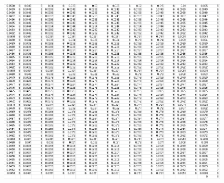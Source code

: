 \documentclass{article}
\begin{document}
\begin{center}
\begin{figure}
 \includegraphics[keepaspectratio,scale=0.7]{111_3000/005to000SpinChart.png}
\end{figure}
 \end{center}
\clearpage
\end{document}
